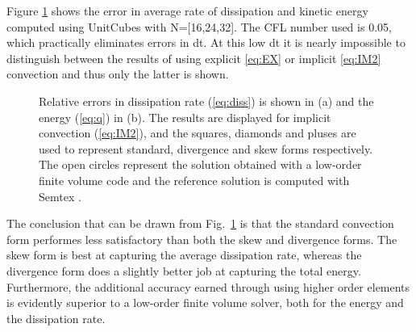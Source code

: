Figure \ref{fig:dissipation} shows the error in average rate of
dissipation and kinetic energy computed using UnitCubes with
N=[16,24,32]. The CFL number used is 0.05, which practically
eliminates errors in dt. At this low dt it is nearly impossible to
distinguish between the results of using explicit \ref{eq:EX} or
implicit \ref{eq:IM2} convection and thus only the latter is shown.
\begin{figure}
  \centering
  \caption{Relative errors in dissipation rate (\ref{eq:diss}) is shown in (a) and the energy (\ref{eq:q}) in (b). The results are displayed for implicit convection (\ref{eq:IM2}), and the squares, diamonds and pluses are used to represent standard, divergence and skew forms respectively. The open circles represent the solution obtained with a low-order finite volume code and the reference solution is computed with Semtex \cite{semtex}. }
  \label{fig:dissipation}
\end{figure}
The conclusion that can be drawn from Fig.~\ref{fig:dissipation} is
that the standard convection form performes less satisfactory than
both the skew and divergence forms. The skew form is best at capturing
the average dissipation rate, whereas the divergence form does a
slightly better job at capturing the total energy. Furthermore, the
additional accuracy earned through using higher order elements is
evidently superior to a low-order finite volume solver, both for the
energy and the dissipation rate.


